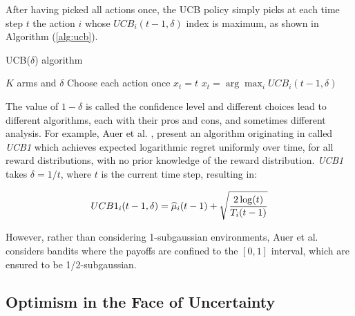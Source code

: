 After having picked all actions once, the \gls{UCB} policy simply picks at each time step $t$ the action $i$ whose $UCB_i(t-1,\delta)$ index is maximum, as shown in Algorithm (\ref{alg:ucb}).

\begin{algorithm}[t]
	\caption{UCB($\delta$) algorithm}
	\label{alg:ucb}
	\begin{algorithmic}[1]
	 $K$ arms and $\delta$
	\State Choose each action once
			\State $x_{t} = t$
		\Else
			\State $x_t = \arg\max_i UCB_i(t-1, \delta)$
		\EndIf
	\EndFor
	\end{algorithmic}
\end{algorithm}


The value of $1-\delta$ is called the confidence level and different choices lead to different algorithms, each with their pros and cons, and sometimes different analysis. For example, Auer et al. \cite{auer2002finite}, present an algorithm originating in \cite{agrawal1995continuum} called \emph{UCB1} which achieves expected logarithmic regret uniformly over time, for all reward distributions, with no prior knowledge of the reward distribution. \emph{UCB1} takes $\delta=1/t$, where $t$ is the current time step, resulting in:

\begin{align}
UCB1_i(t-1, \delta) = \widehat{\mu}_i(t-1) + \sqrt{\frac{2\log(t)}{T_i(t-1)}}
\end{align}

However, rather than considering 1-subgaussian environments, Auer et al. \cite{auer2002finite} considers bandits where the payoffs are confined to the $[0,1]$ interval, which are ensured to be 1/2-subgaussian.

\subsection{Optimism in the Face of Uncertainty}

